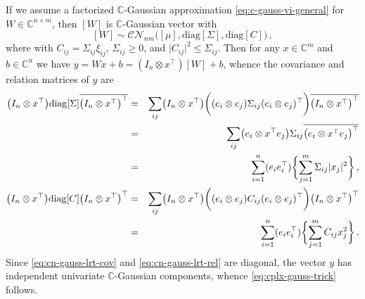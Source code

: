 \documentclass{article}
\newcommand{\cplx}{\mathbb{C}}
\newcommand{\conj}[1]{\overline{#1}}
\newcommand{\diag}[1]{\mathrm{diag}{#1}}
\begin{document}
If we assume a factorized $\cplx$-Gaussian approximation \eqref{eq:c-gauss-vi-general}
for $
  W \in \cplx^{n\times m}
$, then $[W]$ is $\cplx$-Gaussian vector with
\begin{equation}  \label{eq:c-gauss-vi-general-vec}
  [W]
    \sim \mathcal{C}\mathcal{N}_{nm} \bigl(
      [\mu], \diag{[\Sigma]}, \diag{[C]}
    \bigr)
  \,,
\end{equation}
where with $C_{ij} = \Sigma_{ij} \xi_{ij}$, $\Sigma_{ij} \geq 0$, and $
  \lvert C_{ij} \rvert^2 \leq \Sigma_{ij}
$. Then for any $x \in \cplx^m$ and $b\in \cplx^n$ we have $
  y = W x + b
    = (I_n \otimes x^\top) [W] + b
$, whence the covariance and relation matrices of $y$ are
\begin{eqnarray}
  \bigl(I_n \otimes x^\top\bigr)
    \diag{[\Sigma]}
  \conj{\bigl(I_n \otimes x^\top\bigr)^\top}
    &=& \sum_{ij}
      \bigl(I_n \otimes x^\top\bigr)
      \biggl(
        (e_i \otimes e_j)
          \Sigma_{ij}
        (e_i \otimes e_j)^\top
      \biggr)
      \conj{\bigl(I_n \otimes x^\top\bigr)^\top}
    \notag \\
    &=& \sum_{ij}
      \bigl(e_i \otimes x^\top e_j \bigr)
        \Sigma_{ij}
      \conj{\bigl(e_i \otimes x^\top e_j \bigr)^\top}
    \notag \\
    &=&
      \sum_{i=1}^n (e_i e_i^\top)
        \biggl\{
          \sum_{j=1}^m \Sigma_{ij} \lvert x_j \rvert^2
        \biggr\}
    \,,  \label{eq:cn-gauss-lrt-cov} \\
  \bigl(I_n \otimes x^\top\bigr)
    \diag{[C]}
  \bigl(I_n \otimes x^\top\bigr)^\top
    &=& \sum_{ij}
      \bigl(I_n \otimes x^\top\bigr)
      \biggl(
        (e_i \otimes e_j)
          C_{ij}
        (e_i \otimes e_j)^\top
      \biggr)
      \bigl(I_n \otimes x^\top\bigr)^\top
    \notag \\
    &=&
      \sum_{i=1}^n (e_i e_i^\top)
        \biggl\{
          \sum_{j=1}^m C_{ij} x_j^2
        \biggr\}
    \,.  \label{eq:cn-gauss-lrt-rel}
\end{eqnarray}
Since \eqref{eq:cn-gauss-lrt-cov} and \eqref{eq:cn-gauss-lrt-rel} are diagonal, the
vector $y$ has independent univariate $\cplx$-Gaussian components, whence
\eqref{eq:cplx-gauss-trick} follows.
\end{document}

